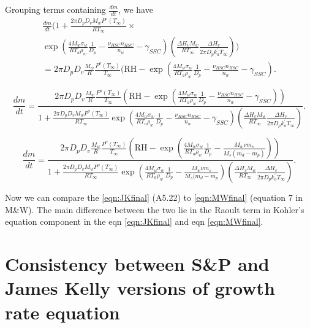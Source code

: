 \documentclass[12pt]{amsart}
\begin{document}
Grouping terms containing $\frac{dm}{dt}$, we have  
\begin{eqnarray}\label{eqn:51}
\frac{dm}{dt}(1+\frac{2 \pi D_{p} D_{v} M_{w} P^{o}(T_{\infty})}{R T_{\infty}} \times \\  \nonumber
\exp(\frac{4 M_{w}\sigma_{w}}{R T_{a} \rho_w} \frac{1}{D_{p}}- \frac{\nu_{HSC}n_{HSC}} {n_{w}}-\gamma_{SSC})(\frac{\Delta H_{v} M_{w}} {R T_{\infty}}\frac{\Delta H_{v}}{2 \pi D_{p} k^{'}_{a} T_{\infty}})) \\  \nonumber
=2 \pi D_{p} D_{v}  \frac{M_{w}}{R} \frac{P^{o}(T_{\infty})} {T_{\infty}} 
(\textrm{RH}-\exp( \frac{4 M_{w}\sigma_{w}}{R T_{a} \rho_w}\frac{1}{D_{p}}-\frac{\nu_{HSC}n_{HSC}}{n_{w}}-\gamma_{SSC}). \nonumber
\end{eqnarray}

\begin{equation}\label{eqn:JKfinal}
\frac{dm}{dt}= \frac{2 \pi D_{p} D_{v}  \frac{M_{w}}{R} \frac{P^{o}(T_{\infty})} {T_{\infty}} 
(\textrm{RH} - \exp(\frac{4 M_{w}\sigma_{w}}{R T_{a} \rho_w} \frac{1}{D_{p}}- \frac{\nu_{HSC}n_{HSC}} {n_{w}}-\gamma_{SSC}))}{1+\frac{2 \pi D_{p} D_{v} M_{w} P^{o}(T_{\infty})}{R T_{\infty}} \exp(\frac{4 M_{w}\sigma_{w}}{R T_{a} \rho_w} \frac{1}{D_{p}}- \frac{\nu_{HSC}n_{HSC}} {n_{w}}-\gamma_{SSC})(\frac{\Delta H_{v} M_{w}} {R T_{\infty}}\frac{\Delta H_{v}}{2 \pi D_{p} k^{'}_{a} T_{\infty}})}. 
\end{equation}


\begin{equation}\label{eqn:MWfinal}
\frac{dm}{dt}= \frac{2 \pi D_{p} D_{v}  \frac{M_{w}}{R} \frac{P^{o}(T_{\infty})} {T_{\infty}} 
(\textrm{RH} - \exp( \frac{4 M_{w}\sigma_{w}}{R T_{a} \rho_w} 
\frac{1}{D_{p}}-\frac{ M_{w} \nu m_{s}}{M_{s} (m_{d}-m_{p})}))}{1+\frac{2 \pi D_{p} D_{v} M_{w} P^{o}(T_{\infty})}{R T_{\infty}} \exp(\frac{4 M_{w}\sigma_{w}}{R T_{a} \rho_w}\frac{1}{D_{p}}-\frac{ M_{w} \nu m_{s}}{M_{s} (m_{d}-m_{p}}) (\frac{\Delta H_{v} M_{w}} {R T_{\infty}}\frac{\Delta H_{v}}{2 \pi D_{p} k^{'}_{a} T_{\infty}})}. 
\end{equation}

Now we can compare the \ref{eqn:JKfinal} (A5.22) to \ref{eqn:MWfinal} (equation 7 in M\&W). The main difference between the two lie in the Raoult term in Kohler's equation component in the eqn \ref{eqn:JKfinal} and eqn \ref{eqn:MWfinal}. 


\section{Consistency between S\&P and James Kelly versions of growth rate equation}
\end{document}
